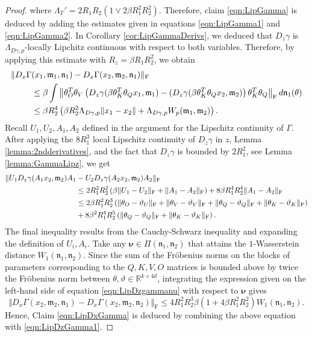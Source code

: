 \documentclass{article}
\newcommand{\R}{\mathbb{R}}
\begin{document}
\begin{appendices}
\begin{proof}
    where $\Lambda_\Gamma'=2R_1R_2(1\vee 2\beta R_1^2R_2^2)$.
    Therefore, claim \eqref{eqn:LipGamma} is deduced by adding the estimates given in equations \eqref{eqn:LipGamma1} and \eqref{eqn:LipGamma2}. In Corollary \ref{cor:LipGammaDerivs}, we deduced that $D_z\gamma$ is $\Lambda_{D\gamma,p}$-locally Lipchitz continuous with respect to both variables. Therefore, by applying this estimate with $R_z=\beta R_1R_2^2$, we obtain
    \begin{align}\label{eqn:LipDzGamma1}
        \Vert D_x\Gamma&(x_1,\mathfrak{m}_1,\mathfrak{n}_1)- D_x\Gamma(x_2,\mathfrak{m}_2,\mathfrak{n}_1) \Vert_\mathrm{F}\\&\le\beta \int \left \Vert\theta_O^T\theta_V\left(D_z\gamma(\beta \theta_K^T\theta_Q x_1,\mathfrak{m}_1)-(D_z\gamma(\beta \theta_K^T\theta_Q x_2,\mathfrak{m}_2) \right)\theta_K^T\theta_Q\right\Vert_\mathrm{F}d\mathfrak{n}_1(\theta)\notag\\
        & \le \beta R_2^4 \left( \beta R_2^2 \Lambda_{D\gamma,p}\Vert x_1-x_2\Vert+ \Lambda_{D\gamma,p}W_p(\mathfrak{m}_1,\mathfrak{m}_2)\right).\notag
    \end{align}
    Recall $U_1,U_2,A_1,A_2$ defined  in the argument for the Lipschitz continuity of $\Gamma$. After applying the $8R_1^3$ local Lipschitz continuity of $D_z\gamma$ in $z$,  Lemma \ref{lemma:2ndderivatives}, and the fact that $D_z\gamma$ is bounded by $2R_1^2$, see Lemma \ref{lemma:GammaLipz}, we get
    \begin{align}\label{eqn:LipDzgammanu}
        \Vert U_1D_z\gamma(A_1x_2,\mathfrak{m}_2)A_1&-U_2D_z\gamma(A_2x_2,\mathfrak{m}_2)A_2\Vert_\mathrm{F} \\
          & \le 2 R^2_1R_2^2 \left(\beta\Vert U_1-U_2\Vert_\mathrm{F}+\Vert A_1-A_2\Vert_\mathrm{F}\right)+8\beta R_1^4R_2^4\Vert A_1-A_2\Vert_\mathrm{F}\notag\\&\le 2 \beta R^2_1R_2^3 \left(\Vert \theta_O-\vartheta_U\Vert_\mathrm{F}+ \Vert \theta_V-\vartheta_V\Vert_\mathrm{F}+\Vert \theta_Q-\vartheta_Q\Vert_\mathrm{F}+\Vert \theta_K-\vartheta_K\Vert_\mathrm{F}\right)\notag\\&+8\beta^2R_1^4R_2^5\left(\Vert \theta_Q-\vartheta_Q\Vert_\mathrm{F}+ \Vert \theta_K-\vartheta_K\Vert_\mathrm{F}\right).\notag
    \end{align}
    The final inequality results from the Cauchy-Schwarz inequality and expanding the definition of $U_i,A_i$. Take any $\bm\nu\in \Pi(\mathfrak{n}_1,\mathfrak{n}_2)$ that attains the $1$-Wasserstein distance $W_1(\mathfrak{n}_1,\mathfrak{n}_2)$.  Since the sum of the Fr\"obenius norms on the blocks of parameters corresponding to the $Q,K,V,O$ matrices is bounded above by twice the Fr\"obenius norm between $\theta,\vartheta\in \R^{k\times4d}$, integrating the expression given on the left-hand side of equation \eqref{eqn:LipDzgammanu} with respect to $\bm{\nu}$ gives
    \[
    \Vert D_x\Gamma(x_2,\mathfrak{m}_2,\mathfrak{n}_1)-D_x\Gamma(x_2,\mathfrak{m}_2,\mathfrak{n}_2)\Vert_\mathrm{F}\le 4R_1^2R_2^3\beta(1+4\beta R_1^2R_2^2) W_1(\mathfrak{n}_1,\mathfrak{n}_2).
    \]
    Hence,  Claim \eqref{eqn:LipDxGamma} is deduced by combining the above equation with \eqref{eqn:LipDzGamma1}.


\end{proof}
\end{appendices}
\end{document}
